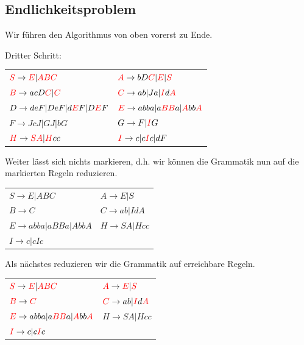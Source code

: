 \documentclass{article}
\begin{document}
\subsection*{Endlichkeitsproblem}
Wir führen den Algorithmus von oben vorerst zu Ende.
\begin{center}
\begin{samepage}
Dritter Schritt:\\
\begin{tabular}{ll}
${\color{red}S} \rightarrow {\color{red}E} | {\color{red}ABC}$  & ${\color{red}A} \rightarrow bD{\color{red}C} | {\color{red}E} | {\color{red}S}$ \\
${\color{red}B} \rightarrow acD{\color{red}C} | {\color{red}C}$ & ${\color{red}C} \rightarrow ab | Ja | {\color{red}I}d{\color{red}A}$ \\
$D \rightarrow deF | DeF | d{\color{red}E}F | D{\color{red}E}F$ & ${\color{red}E} \rightarrow abba | a{\color{red}BB}a | {\color{red}A}bb{\color{red}A}$ \\
$F \rightarrow JcJ | GJ | bG$                                   & $G \rightarrow F | {\color{red}I}G$ \\
${\color{red}H} \rightarrow {\color{red}SA} | {\color{red}H}cc$ & ${\color{red}I} \rightarrow c | c{\color{red}I}c | dF$
\end{tabular}
\end{samepage}
\end{center}
Weiter lässt sich nichts markieren, d.h. wir können die Grammatik nun auf die markierten Regeln reduzieren.
\begin{center}
\begin{tabular}{ll}
$S \rightarrow E | ABC$            & $A \rightarrow E | S$ \\
$B \rightarrow C$                  & $C \rightarrow ab | IdA$ \\
$E \rightarrow abba | aBBa | AbbA$ & $H \rightarrow SA | Hcc$ \\
$I \rightarrow c | cIc$            & \\
\end{tabular}
\end{center}
Als nächstes reduzieren wir die Grammatik auf erreichbare Regeln.
\begin{center}
\begin{tabular}{ll}
${\color{red}S} \rightarrow {\color{red}E} | {\color{red}ABC}$                         & ${\color{red}A} \rightarrow {\color{red}E} | {\color{red}S}$ \\
${\color{red}B} \rightarrow {\color{red}C}$                                            & ${\color{red}C} \rightarrow ab | {\color{red}I}d{\color{red}A}$ \\
${\color{red}E} \rightarrow abba | a{\color{red}BB}a | {\color{red}A}bb{\color{red}A}$ & $H \rightarrow SA | Hcc$ \\
${\color{red}I} \rightarrow c | c{\color{red}I}c$                                      & \\
\end{tabular}
\end{center}
\end{document}

